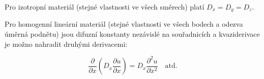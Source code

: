 \documentclass{article}
\begin{document}
\begin{multicols}{3}
Pro izotropní materiál (stejné vlastnosti ve všech směrech) platí $D_x=D_y=D_z$.

Pro homogenní lineární materiál (stejné vlastnosti ve všech bodech a odezva úměrná podnětu) jsou difuzní konstanty nezávislé na souřadnicích a kvaziderivace je možno nahradit druhými derivacemi:

$$\frac{\partial}{\partial x}\left(D_x\frac{\partial u}{\partial x}\right)=
D_x\frac{\partial ^2u}{\partial x^2}\quad \text{atd.}$$

\end{multicols}
\end{document}
